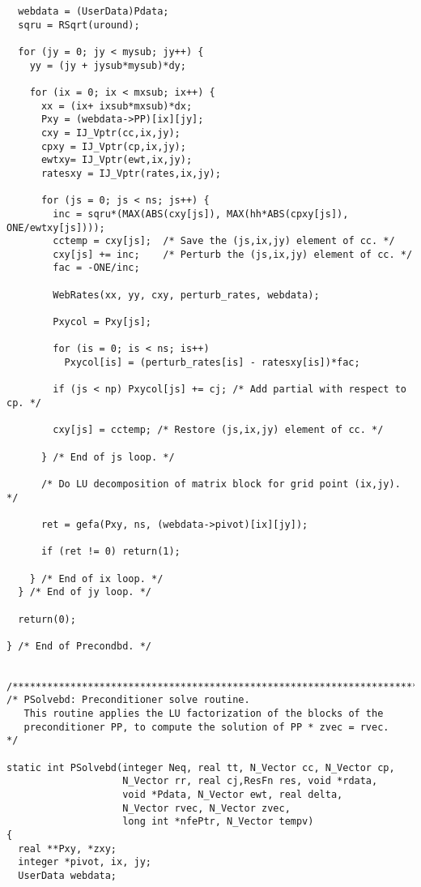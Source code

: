 \documentclass[11pt]{article}
\begin{document}
\begin{verbatim}
  webdata = (UserData)Pdata;
  sqru = RSqrt(uround); 

  for (jy = 0; jy < mysub; jy++) {
    yy = (jy + jysub*mysub)*dy;

    for (ix = 0; ix < mxsub; ix++) {
      xx = (ix+ ixsub*mxsub)*dx;
      Pxy = (webdata->PP)[ix][jy];
      cxy = IJ_Vptr(cc,ix,jy); 
      cpxy = IJ_Vptr(cp,ix,jy); 
      ewtxy= IJ_Vptr(ewt,ix,jy);
      ratesxy = IJ_Vptr(rates,ix,jy);

      for (js = 0; js < ns; js++) {
        inc = sqru*(MAX(ABS(cxy[js]), MAX(hh*ABS(cpxy[js]), ONE/ewtxy[js])));
        cctemp = cxy[js];  /* Save the (js,ix,jy) element of cc. */
        cxy[js] += inc;    /* Perturb the (js,ix,jy) element of cc. */
        fac = -ONE/inc;
 
        WebRates(xx, yy, cxy, perturb_rates, webdata);

        Pxycol = Pxy[js];

        for (is = 0; is < ns; is++)
          Pxycol[is] = (perturb_rates[is] - ratesxy[is])*fac;

        if (js < np) Pxycol[js] += cj; /* Add partial with respect to cp. */

        cxy[js] = cctemp; /* Restore (js,ix,jy) element of cc. */

      } /* End of js loop. */

      /* Do LU decomposition of matrix block for grid point (ix,jy). */

      ret = gefa(Pxy, ns, (webdata->pivot)[ix][jy]);

      if (ret != 0) return(1);

    } /* End of ix loop. */
  } /* End of jy loop. */

  return(0);

} /* End of Precondbd. */


/*************************************************************************/
/* PSolvebd: Preconditioner solve routine.
   This routine applies the LU factorization of the blocks of the
   preconditioner PP, to compute the solution of PP * zvec = rvec.       */

static int PSolvebd(integer Neq, real tt, N_Vector cc, N_Vector cp,
                    N_Vector rr, real cj,ResFn res, void *rdata,
                    void *Pdata, N_Vector ewt, real delta,
                    N_Vector rvec, N_Vector zvec,
                    long int *nfePtr, N_Vector tempv)
{
  real **Pxy, *zxy;
  integer *pivot, ix, jy;
  UserData webdata;


\end{verbatim}
\end{document}
